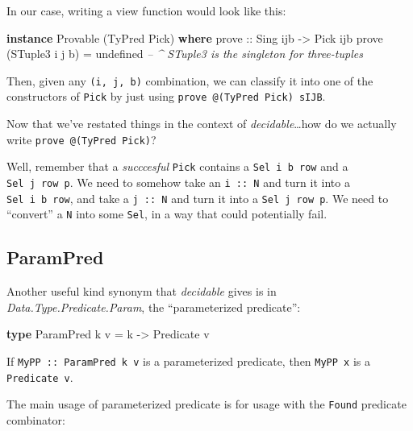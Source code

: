 \documentclass[]{article}
\newenvironment{Shaded}{}{}
\newcommand{\CommentTok}[1]{\textcolor[rgb]{0.38,0.63,0.69}{\textit{#1}}}
\newcommand{\DataTypeTok}[1]{\textcolor[rgb]{0.56,0.13,0.00}{#1}}
\newcommand{\FunctionTok}[1]{\textcolor[rgb]{0.02,0.16,0.49}{#1}}
\newcommand{\KeywordTok}[1]{\textcolor[rgb]{0.00,0.44,0.13}{\textbf{#1}}}
\newcommand{\NormalTok}[1]{#1}
\newcommand{\OtherTok}[1]{\textcolor[rgb]{0.00,0.44,0.13}{#1}}
\begin{document}
In our case, writing a view function would look like this:

\begin{Shaded}
\begin{Highlighting}[]
\KeywordTok{instance} \DataTypeTok{Provable}\NormalTok{ (}\DataTypeTok{TyPred} \DataTypeTok{Pick}\NormalTok{) }\KeywordTok{where}
\OtherTok{    prove ::} \DataTypeTok{Sing}\NormalTok{ ijb }\OtherTok{->} \DataTypeTok{Pick}\NormalTok{ ijb}
\NormalTok{    prove (}\DataTypeTok{STuple3}\NormalTok{ i j b) }\FunctionTok{=}\NormalTok{ undefined}
        \CommentTok{-- ^ STuple3 is the singleton for three-tuples}
\end{Highlighting}
\end{Shaded}

Then, given any \texttt{(i,\ j,\ b)} combination, we can classify it into one of
the constructors of \texttt{Pick} by just using
\texttt{prove\ @(TyPred\ Pick)\ sIJB}.

Now that we've restated things in the context of \emph{decidable}\ldots{}how do
we actually write \texttt{prove\ @(TyPred\ Pick)}?

Well, remember that a \emph{succcesful} \texttt{Pick} contains a
\texttt{Sel\ i\ b\ row} and a \texttt{Sel\ j\ row\ p}. We need to somehow take
an \texttt{i\ ::\ N} and turn it into a \texttt{Sel\ i\ b\ row}, and take a
\texttt{j\ ::\ N} and turn it into a \texttt{Sel\ j\ row\ p}. We need to
``convert'' a \texttt{N} into some \texttt{Sel}, in a way that could potentially
fail.

\hypertarget{parampred}{%
\subsection{ParamPred}\label{parampred}}

Another useful kind synonym that \emph{decidable} gives is in
\emph{Data.Type.Predicate.Param}, the ``parameterized predicate'':

\begin{Shaded}
\begin{Highlighting}[]
\KeywordTok{type} \DataTypeTok{ParamPred}\NormalTok{ k v }\FunctionTok{=}\NormalTok{ k }\OtherTok{->} \DataTypeTok{Predicate}\NormalTok{ v}
\end{Highlighting}
\end{Shaded}

If \texttt{MyPP\ ::\ ParamPred\ k\ v} is a parameterized predicate, then
\texttt{MyPP\ x} is a \texttt{Predicate\ v}.

The main usage of parameterized predicate is for usage with the \texttt{Found}
predicate combinator:
\end{document}
